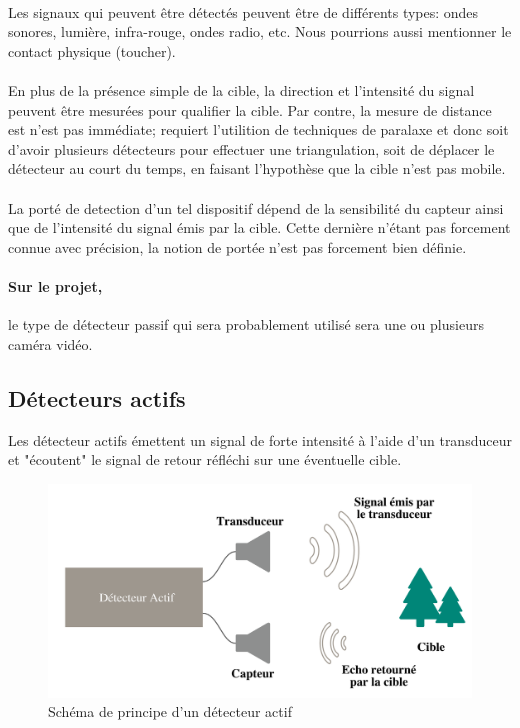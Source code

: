 \documentclass[12pt,a4paper]{report}
\begin{document}
\paragraph{} Les signaux qui peuvent être détectés peuvent être de différents types: ondes sonores, lumière, infra-rouge, ondes radio, etc. Nous pourrions aussi mentionner le contact physique (toucher).

\paragraph{} En plus de la présence simple de la cible, la direction et l'intensité du signal peuvent être mesurées pour qualifier la cible. Par contre, la mesure de distance est n'est pas immédiate; requiert l'utilition de techniques de paralaxe et donc soit d'avoir plusieurs détecteurs pour effectuer une triangulation, soit de déplacer le détecteur au court du temps, en faisant l'hypothèse que la cible n'est pas mobile.

\paragraph{} La porté de detection d'un tel dispositif dépend de la sensibilité du capteur ainsi que de l'intensité du signal émis par la cible. Cette dernière n'étant pas forcement connue avec précision, la notion de portée n'est pas forcement bien définie.

\paragraph{Sur le projet,} le type de détecteur passif qui sera probablement utilisé sera une ou plusieurs caméra vidéo.

\subsection{Détecteurs actifs}

Les détecteur actifs émettent un signal de forte intensité à l'aide d'un transduceur et "écoutent" le signal de retour réfléchi sur une éventuelle cible. 

\begin{figure}[H]
	\centering
	\includegraphics[width=0.8\linewidth]{img/detecteuractif}
	\caption{Schéma de principe d'un détecteur actif}
	\label{fig:detecteuractif}
\end{figure}
\end{document}
